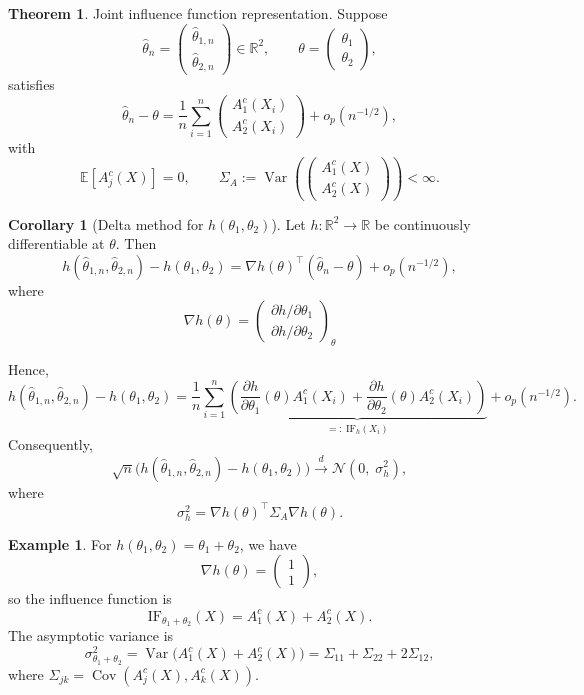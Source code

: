 \documentclass[11pt]{article}
\theoremstyle{definition}
\newtheorem{exmp}{Example}[section]
\newtheorem{theo}{Theorem}[section]
\newtheorem{corollary}{Corollary}[section]
\begin{document}
\begin{theo}{Joint influence function representation.}
    Suppose
\[
\hat\theta_n
=
\begin{pmatrix}
\hat\theta_{1,n} \\
\hat\theta_{2,n}
\end{pmatrix}
\in \mathbb{R}^2,
\qquad
\theta
=
\begin{pmatrix}
\theta_1 \\
\theta_2
\end{pmatrix},
\]
satisfies
\[
\hat\theta_n - \theta
=
\frac{1}{n}\sum_{i=1}^n
\begin{pmatrix}
A_1^c(X_i) \\
A_2^c(X_i)
\end{pmatrix}
+ o_p(n^{-1/2}),
\]
with
\[
\mathbb{E}[A_j^c(X)] = 0,
\qquad
\Sigma_A :=
\operatorname{Var}
\!\left(
\begin{pmatrix}
A_1^c(X) \\
A_2^c(X)
\end{pmatrix}
\right)
< \infty.
\]
\end{theo}
\begin{corollary}[Delta method for $h(\theta_1,\theta_2)$]
    Let $h:\mathbb{R}^2 \to \mathbb{R}$ be continuously differentiable at $\theta$.
Then
\[
h(\hat\theta_{1,n}, \hat\theta_{2,n}) - h(\theta_1, \theta_2)
=
\nabla h(\theta)^\top (\hat\theta_n - \theta) + o_p(n^{-1/2}),
\]
where
\[
\nabla h(\theta)
=
\begin{pmatrix}
\partial h / \partial \theta_1 \\
\partial h / \partial \theta_2
\end{pmatrix}_{\theta}
\]
    
Hence,
\[
h(\hat\theta_{1,n}, \hat\theta_{2,n}) - h(\theta_1, \theta_2)
=
\frac{1}{n}\sum_{i=1}^n
\underbrace{
\left(
\frac{\partial h}{\partial \theta_1}(\theta) A_1^c(X_i)
+
\frac{\partial h}{\partial \theta_2}(\theta) A_2^c(X_i)
\right)
}_{=: \ \mathrm{IF}_h(X_i)}
+ o_p(n^{-1/2}).
\]
Consequently,
\[
\sqrt{n}
\Big(
h(\hat\theta_{1,n}, \hat\theta_{2,n})
-
h(\theta_1, \theta_2)
\Big)
\xrightarrow{d}
\mathcal{N}\!\left(0, \; \sigma_h^2 \right),
\]
where
\[
\sigma_h^2
=
\nabla h(\theta)^\top
\Sigma_A
\nabla h(\theta).
\]
\end{corollary}
\begin{exmp}
    For $h(\theta_1,\theta_2) = \theta_1 + \theta_2$, we have
\[
\nabla h(\theta)
=
\begin{pmatrix}
1 \\
1
\end{pmatrix},
\]
so the influence function is
\[
\boxed{
\mathrm{IF}_{\theta_1 + \theta_2}(X)
=
A_1^c(X) + A_2^c(X).
}
\]
The asymptotic variance is
\[
\boxed{
\sigma_{\theta_1 + \theta_2}^2
=
\operatorname{Var}\!\big(A_1^c(X) + A_2^c(X)\big)
=
\Sigma_{11} + \Sigma_{22} + 2\Sigma_{12},
}
\]
where $\Sigma_{jk} = \operatorname{Cov}(A_j^c(X), A_k^c(X))$.
\end{exmp}
\end{document}
